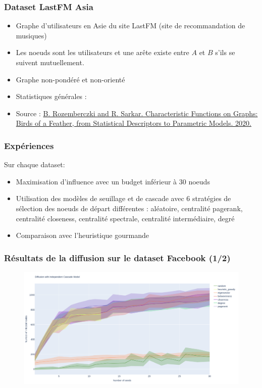 \documentclass[11pt]{beamer}
\begin{document}
	\begin{frame}
		\frametitle{Dataset LastFM Asia}
		\begin{itemize}
			\item{Graphe d'utilisateurs en Asie du site LastFM (site de recommandation de musiques)}
			\item{Les noeuds sont les utilisateurs et une arête existe entre $A$ et $B$ s'ils se suivent mutuellement.}
			
			\item{Graphe non-pondéré et non-orienté}
			\item{Statistiques générales : 
				
				\begin{center}
				\end{center}
			}
			\item \small Source : \href{https://arxiv.org/abs/2005.07959}{B. Rozemberczki and R. Sarkar. Characteristic Functions on Graphs: Birds of a Feather, from Statistical Descriptors to Parametric Models. 2020.}
		\end{itemize}
	\end{frame}
	\begin{frame}
		\frametitle{Expériences}
		Sur chaque dataset:
		\begin{itemize}
			\item Maximisation d'influence avec un budget inférieur à 30 noeuds
			\item Utilisation des modèles de seuillage et de cascade avec 6 stratégies de sélection des noeuds de départ différentes : aléatoire, centralité pagerank, centralité closeness, centralité spectrale, centralité intermédiaire, degré
			\item Comparaison avec l'heuristique gourmande 
		\end{itemize}
	\end{frame}
	\begin{frame}
		\frametitle{Résultats de la diffusion sur le dataset Facebook (1/2)}
			\begin{figure}
				\centering
				\includegraphics[width=\textwidth, height=0.8\textheight]{./images/facebook_icm.png}
			\end{figure}
	\end{frame}
\end{document}
